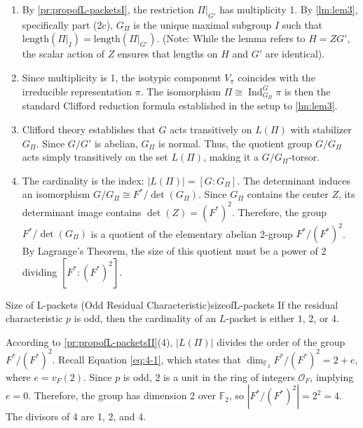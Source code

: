 \documentclass{article}
\newcommand{\CO}{{\mathcal{O}}}
\begin{document}
\begin{Proof}
  \begin{enumerate}
    \item By \cref{pr:propofL-packetsI}, the restriction \(\Pi|_{G'}\) has multiplicity 1. By \cref{lm:lem3}, specifically part (2c), \(G_\Pi\) is the unique maximal subgroup \(I\) such that \(\mathrm{length}(\Pi|_I) = \mathrm{length}(\Pi|_{G'})\).
    (Note: While the lemma refers to \(H = ZG'\), the scalar action of \(Z\) ensures that lengths on \(H\) and \(G'\) are identical).

    \item Since multiplicity is 1, the isotypic component \(V_\pi\) coincides with the irreducible
      representation \(\pi\). The isomorphism \(\Pi \cong \operatorname{Ind}_{G_\Pi}^G \pi\) is then the
      standard Clifford reduction formula established in the setup to \cref{lm:lem3}.

    \item Clifford theory establishes that \(G\) acts transitively on \(L(\Pi)\) with stabilizer \(G_\Pi\). Since \(G/G'\) is abelian, \(G_\Pi\) is normal. Thus, the quotient group \(G/G_\Pi\) acts simply transitively on the set \(L(\Pi)\), making it a \(G/G_\Pi\)-torsor.

    \item The cardinality is the index: \(|L(\Pi)| = [G : G_\Pi]\).
    The determinant induces an isomorphism \(G/G_\Pi \cong F^*/\det(G_\Pi)\).
    Since \(G_\Pi\) contains the center \(Z\), its determinant image contains \(\det(Z) = (F^*)^2\).
    Therefore, the group \(F^*/\det(G_\Pi)\) is a quotient of the elementary abelian 2-group \(F^*/(F^*)^2\).
    By Lagrange's Theorem, the size of this quotient must be a power of 2 dividing \([F^* : (F^*)^2]\).
  \end{enumerate}
\end{Proof}



\begin{thm}{Size of L-packets (Odd Residual Characteristic)}{sizeofL-packets}
  If the residual characteristic \(p\) is odd, then the cardinality of an \(L\)-packet is either \(1\), \(2\), or \(4\).
\end{thm}

\begin{Proof}
  According to \cref{pr:propofL-packetsII}(4), \(|L(\Pi)|\) divides the order of the group \(F^*/(F^*)^2\).
  Recall Equation \eqref{eq:4-1}, which states that \(\dim_{\mathbb{F}_2} F^*/(F^*)^2 = 2 + e\), where \(e = v_F(2)\).
  Since \(p\) is odd, \(2\) is a unit in the ring of integers \(\CO_F\), implying \(e = 0\).
  Therefore, the group has dimension 2 over \(\mathbb{F}_2\), so \(|F^*/(F^*)^2| = 2^2 = 4\).
  The divisors of 4 are 1, 2, and 4.
\end{Proof}
\end{document}
